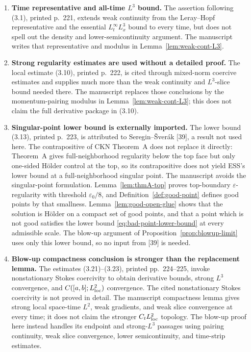 \documentclass[11pt,letterpaper]{article}
\numberwithin{equation}{section}
\theoremstyle{plain}
\theoremstyle{definition}
\theoremstyle{remark}
\begin{document}
\begin{enumerate}
\item \textbf{Time representative and all-time \(L^3\) bound.} The assertion following (3.1), printed p.~221, extends weak continuity from the Leray--Hopf representative and the essential \(L^\infty_tL^3_x\) bound to every time, but does not spell out the density and lower-semicontinuity argument. The manuscript writes that representative and modulus in Lemma~\ref{lem:weak-cont-L3}.

\item \textbf{Strong regularity estimates are used without a detailed proof.} The local estimate (3.10), printed p.~222, is cited through mixed-norm coercive estimates and supplies much more than the weak continuity and \(L^3\)-slice bound needed there. The manuscript replaces those conclusions by the momentum-pairing modulus in Lemma~\ref{lem:weak-cont-L3}; this does not claim the full derivative package in (3.10).

\item \textbf{Singular-point lower bound is externally imported.} The lower bound (3.13), printed p.~223, is attributed to Seregin--Šverák [39], a result not used here. The contrapositive of CKN Theorem~A does not replace it directly: Theorem~A gives full-neighborhood regularity below the top face but only one-sided Hölder control at the top, so its contrapositive does not yield ESS's lower bound at a full-neighborhood singular point. The manuscript avoids the singular-point formulation. Lemma~\ref{lem:thmA-top} proves top-boundary \(\varepsilon\)-regularity with threshold \(\varepsilon_0/8\), and Definition~\ref{def:good-point} defines good points by that smallness. Lemma~\ref{lem:good-open-glue} shows that the solution is Hölder on a compact set of good points, and that a point which is not good satisfies the lower bound \eqref{eq:bad-point-lower-bound} at every admissible scale. The blow-up argument of Proposition~\ref{prop:blowup-limit} uses only this lower bound, so no input from [39] is needed.

\item \textbf{Blow-up compactness conclusion is stronger than the replacement lemma.} The estimates (3.21)--(3.23), printed pp.~224--225, invoke nonstationary Stokes coercivity to obtain derivative bounds, strong \(L^3\) convergence, and \(C([a,b];L^2_{\rm loc})\) convergence. The cited nonstationary Stokes coercivity is not proved in detail. The manuscript compactness lemma \cite[Lemma~11.1]{CKNLean} gives strong local space-time \(L^2\), weak gradients, and weak slice convergence at every time; it does not claim the stronger \(C_tL^2_{\rm loc}\) topology. The blow-up proof here instead handles its endpoint and strong-\(L^3\) passages using pairing continuity, weak slice convergence, lower semicontinuity, and time-strip estimates.


\end{enumerate}
\end{document}
